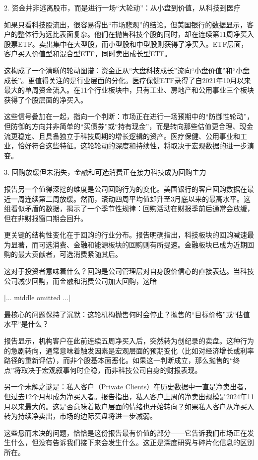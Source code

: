 \documentclass[11pt]{ctexart}
\begin{document}
2. 资金并非逃离股市，而是进行一场“大轮动”：从小盘到价值，从科技到医疗

如果只看科技股流出，很容易得出“市场悲观”的结论。但美国银行的数据显示，客户的整体行为远比表面复杂。他们在抛售科技个股的同时，却在连续第11周净买入股票ETF。卖出集中在大型股，而小型股和中型股则获得了净买入。ETF层面，客户买入价值型和混合型ETF，同时卖出成长型ETF。

这构成了一个清晰的轮动图谱：资金正从“大盘科技成长”流向“小盘价值”和“小盘成长”。更值得关注的是行业层面的分化。医疗保健ETF录得了自2021年10月以来最大的单周资金流入。在11个行业板块中，只有工业、房地产和公用事业三个板块获得了个股层面的净买入。

这些信号叠加在一起，指向一个判断：市场正在进行一场预期中的“防御性轮动”，但防御的方向并非简单的“买债券”或“持有现金”，而是转向那些估值更合理、现金流更稳定、且具备独立于科技周期的增长逻辑的资产。医疗保健、公用事业和工业，恰好符合这些特征。这轮轮动的深度和持续性，将取决于宏观数据的进一步演变。

3. 回购放缓但未消失，金融和可选消费正在接力科技成为回购主力

报告另一个值得深挖的维度是公司回购行为的变化。美国银行的客户回购数据在最近一周连续第二周放缓。然而，滚动四周平均值却升至3月底以来的最高水平。这组看似矛盾的数据，揭示了一个季节性规律：回购活动在财报季前后通常会放缓，但在非财报窗口期会回升。

更关键的结构性变化在于回购的行业分布。报告明确指出，科技板块的回购减速最为显著，而可选消费、金融和能源板块的回购则有所提速。金融板块已成为近期回购的最大贡献者，可选消费紧随其后。

这对于投资者意味着什么？回购是公司管理层对自身股价信心的直接表达。当科技公司减少回购，而金融和消费公司加大回购，这暗

[... middle omitted ...]

最核心的问题保持了沉默：这轮机构抛售何时会停止？抛售的“目标价格”或“估值水平”是什么？

报告显示，机构客户在此前连续五周净买入后，突然转为创纪录的卖盘。这种行为的急剧转向，通常意味着触发因素是宏观层面的预期变化（比如对经济增长或利率路径的重新评估），而非个股基本面恶化。如果这一判断成立，那么抛售的“终点”将取决于宏观叙事何时企稳，而非科技公司自身的财报表现。

另一个未解之谜是：私人客户（Private Clients）在历史数据中一直是净卖出者，但过去12个月却成为净买入者。报告指出，私人客户上周的净卖出规模是2024年11月以来最大的。这是否意味着散户层面的情绪也开始转向？如果私人客户从净买入转为持续净卖出，市场的边际买盘将进一步减弱。

这些悬而未决的问题，恰恰是这份报告最有价值的部分——它告诉我们市场正在发生什么，但没有告诉我们接下来会发生什么。这正是深度研究与碎片化信息的区别所在。
\end{document}
